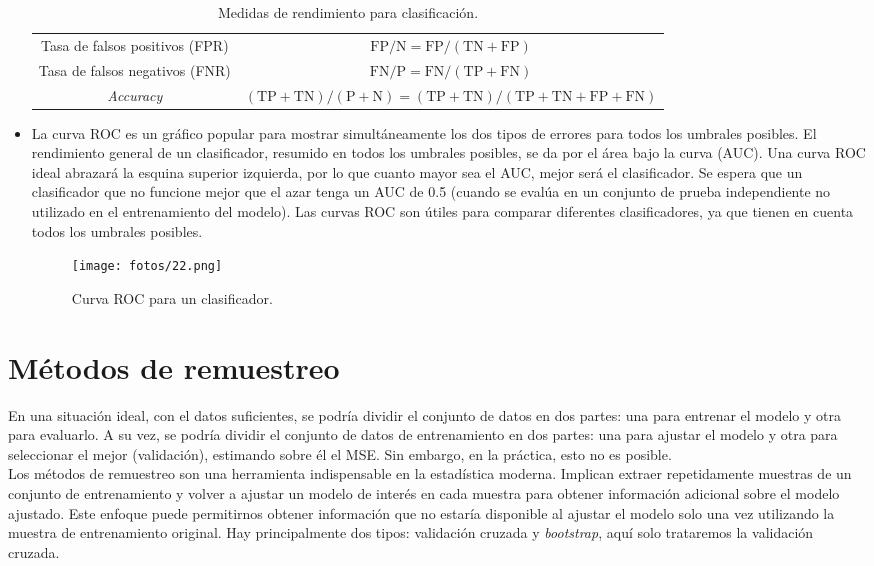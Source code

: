 \begin{itemize}
\begin{table}[h]
{\begin{tabular}{c|c}
Tasa de falsos positivos (FPR) & $\text{FP}/\text{N} = \text{FP}/(\text{TN} + \text{FP})$ \\ 
Tasa de falsos negativos (FNR) & $\text{FN}/\text{P} = \text{FN}/(\text{TP} + \text{FN})$ \\ 
\textit{Accuracy} & $(\text{TP} + \text{TN})/(\text{P} + \text{N}) = (\text{TP} + \text{TN})/(\text{TP} + \text{TN} + \text{FP} + \text{FN})$ \\ \hline
\end{tabular}
}
\caption{Medidas de rendimiento para clasificación.}
\label{tb:4.7}
\end{table}
\item La curva ROC es un gráfico popular para mostrar simultáneamente los dos tipos de errores para todos los umbrales posibles. El rendimiento general de un clasificador, resumido en todos los umbrales posibles, se da por el área bajo la curva (AUC). Una curva ROC ideal abrazará la esquina superior izquierda, por lo que cuanto mayor sea el AUC, mejor será el clasificador. Se espera que un clasificador que no funcione mejor que el azar tenga un AUC de 0.5 (cuando se evalúa en un conjunto de prueba independiente no utilizado en el entrenamiento del modelo). Las curvas ROC son útiles para comparar diferentes clasificadores, ya que tienen en cuenta todos los umbrales posibles.
\begin{figure}[h]
\centering
\texttt{[image: fotos/22.png]}
\caption{Curva ROC para un clasificador.}
\end{figure}
\end{itemize}

\section{Métodos de remuestreo}

En una situación ideal, con el datos suficientes, se podría dividir el conjunto de datos en dos partes: una para entrenar el modelo y otra para evaluarlo. A su vez, se podría dividir el conjunto de datos de entrenamiento en dos partes: una para ajustar el modelo y otra para seleccionar el mejor (validación), estimando sobre él el MSE. Sin embargo, en la práctica, esto no es posible. \\

Los métodos de remuestreo son una herramienta indispensable en la estadística moderna. Implican extraer repetidamente muestras de un conjunto de entrenamiento y volver a ajustar un modelo de interés en cada muestra para obtener información adicional sobre el modelo ajustado. Este enfoque puede permitirnos obtener información que no estaría disponible al ajustar el modelo solo una vez utilizando la muestra de entrenamiento original. Hay principalmente dos tipos: validación cruzada y \textit{bootstrap}, aquí solo trataremos la validación cruzada.

